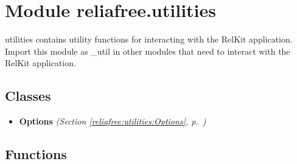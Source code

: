 %
%
%


\section{Module reliafree.utilities}

    \label{reliafree:utilities}
utilities contains utility functions for interacting with the RelKit 
application.  Import this module as \_util in other modules that need to 
interact with the RelKit application.



\subsection{Classes}

\begin{itemize}  \setlength{\parskip}{0ex}
  \item \textbf{Options}
  \textit{(Section \ref{reliafree:utilities:Options}, p.~\pageref{reliafree:utilities:Options})}

\end{itemize}


  \subsection{Functions}

    \label{reliafree:utilities:create_logger}

    \vspace{0.5ex}

